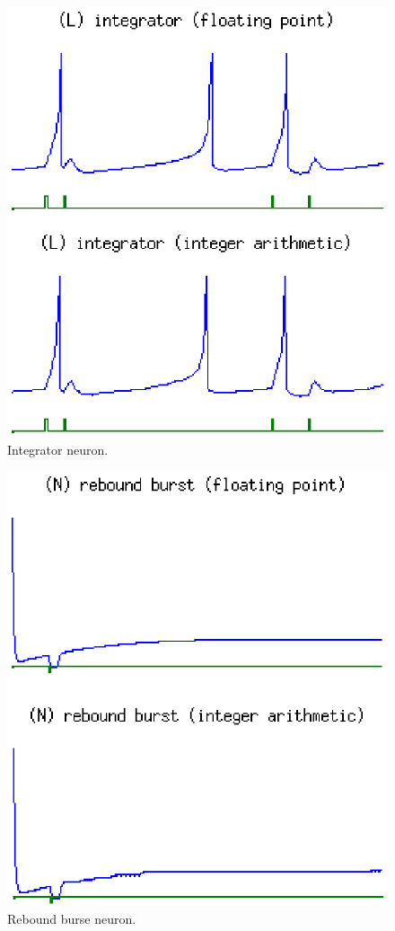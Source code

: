 \documentclass[journal]{./sty/IEEEtran}
\begin{document}
\begin{figure}
\centering
\includegraphics[scale=0.6]{imgs/izh_integrator}
\caption{Integrator neuron.\label{fig:integr8r}}
\end{figure}

\begin{figure}
\centering
\includegraphics[scale=0.6]{imgs/izh_rebound_burst}
\caption{Rebound burse neuron.\label{fig:rebound}}
\end{figure}
\end{document}
